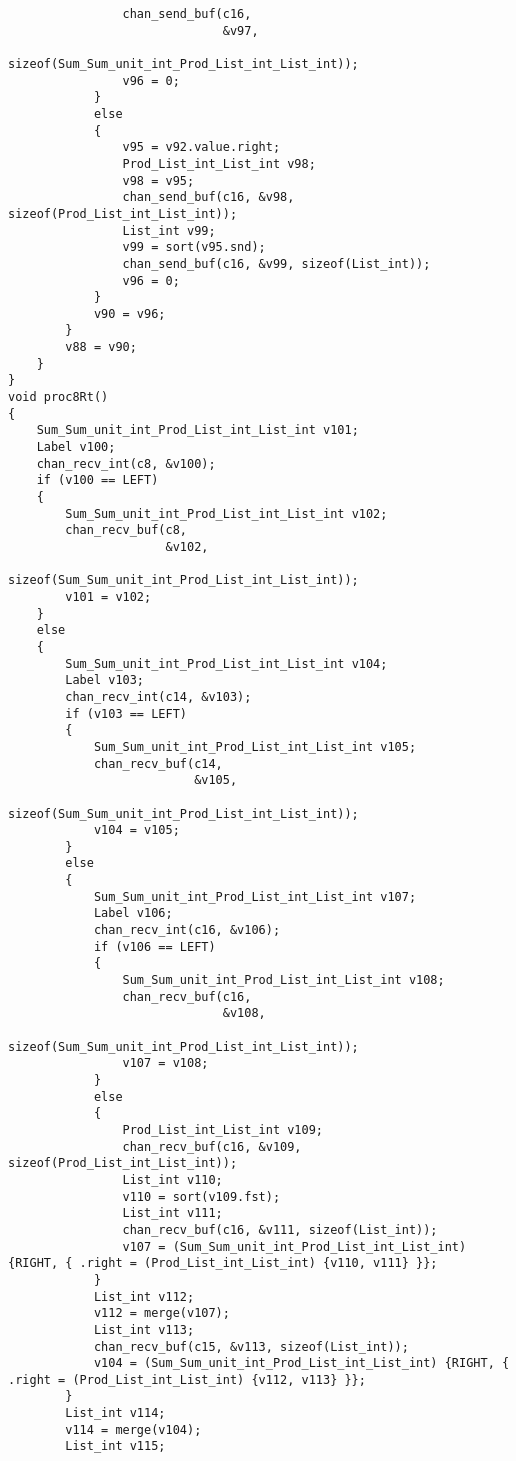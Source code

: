 \begin{lstlisting}
                chan_send_buf(c16,
                              &v97,
                              sizeof(Sum_Sum_unit_int_Prod_List_int_List_int));
                v96 = 0;
            }
            else
            {
                v95 = v92.value.right;
                Prod_List_int_List_int v98;
                v98 = v95;
                chan_send_buf(c16, &v98, sizeof(Prod_List_int_List_int));
                List_int v99;
                v99 = sort(v95.snd);
                chan_send_buf(c16, &v99, sizeof(List_int));
                v96 = 0;
            }
            v90 = v96;
        }
        v88 = v90;
    }
}
void proc8Rt()
{
    Sum_Sum_unit_int_Prod_List_int_List_int v101;
    Label v100;
    chan_recv_int(c8, &v100);
    if (v100 == LEFT)
    {
        Sum_Sum_unit_int_Prod_List_int_List_int v102;
        chan_recv_buf(c8,
                      &v102,
                      sizeof(Sum_Sum_unit_int_Prod_List_int_List_int));
        v101 = v102;
    }
    else
    {
        Sum_Sum_unit_int_Prod_List_int_List_int v104;
        Label v103;
        chan_recv_int(c14, &v103);
        if (v103 == LEFT)
        {
            Sum_Sum_unit_int_Prod_List_int_List_int v105;
            chan_recv_buf(c14,
                          &v105,
                          sizeof(Sum_Sum_unit_int_Prod_List_int_List_int));
            v104 = v105;
        }
        else
        {
            Sum_Sum_unit_int_Prod_List_int_List_int v107;
            Label v106;
            chan_recv_int(c16, &v106);
            if (v106 == LEFT)
            {
                Sum_Sum_unit_int_Prod_List_int_List_int v108;
                chan_recv_buf(c16,
                              &v108,
                              sizeof(Sum_Sum_unit_int_Prod_List_int_List_int));
                v107 = v108;
            }
            else
            {
                Prod_List_int_List_int v109;
                chan_recv_buf(c16, &v109, sizeof(Prod_List_int_List_int));
                List_int v110;
                v110 = sort(v109.fst);
                List_int v111;
                chan_recv_buf(c16, &v111, sizeof(List_int));
                v107 = (Sum_Sum_unit_int_Prod_List_int_List_int) {RIGHT, { .right = (Prod_List_int_List_int) {v110, v111} }};
            }
            List_int v112;
            v112 = merge(v107);
            List_int v113;
            chan_recv_buf(c15, &v113, sizeof(List_int));
            v104 = (Sum_Sum_unit_int_Prod_List_int_List_int) {RIGHT, { .right = (Prod_List_int_List_int) {v112, v113} }};
        }
        List_int v114;
        v114 = merge(v104);
        List_int v115;

\end{lstlisting}
